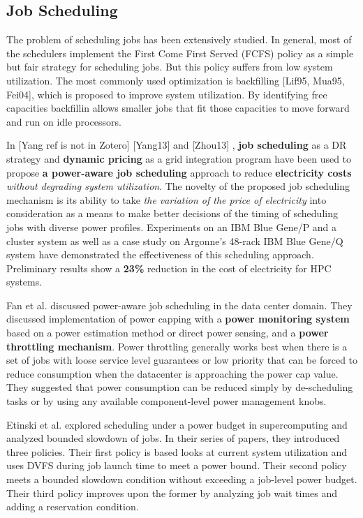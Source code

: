 \subsection{Job Scheduling}
The problem of scheduling jobs has been extensively studied. In general,
most of the schedulers implement the First Come First Served (FCFS) policy
as a simple but fair strategy for scheduling jobs. But this policy suffers
from low system utilization. The most commonly used optimization is backfilling
\cite{lifka_anl/ibm_1995} 
\cite{mualem_utilization_2001}
\cite{feitelson_parallel_2004}
[Lif95, Mua95, Fei04], which is proposed to improve system
utilization. By identifying free capacities backfillin allows smaller
jobs that fit those capacities to move forward and run on idle processors.

In [Yang ref is not in Zotero] 
\cite{zhou_reducing_2013}
[Yang13] and [Zhou13] , \textbf{job scheduling} as a DR strategy and
\textbf{dynamic pricing} as a grid integration program have been used to
propose \textbf{a power-aware job scheduling} approach to reduce
\textbf{electricity costs} \textit{without degrading system utilization}. 
The novelty of the proposed job scheduling
mechanism is its ability to take \textit{the variation of 
the price of electricity }into consideration as a means to make
better decisions of the timing of scheduling jobs with diverse power
profiles. Experiments on an IBM Blue Gene/P and a cluster system as
well as a case study on Argonne's 48-rack IBM Blue Gene/Q system have
demonstrated the effectiveness of this scheduling approach. Preliminary
results show a \textbf{23{\%}} reduction in the cost of electricity for HPC systems.

Fan et al. \cite{PowerAwareServer1} discussed power-aware job scheduling in the data center domain. 
They discussed implementation of power capping with a \textbf{power monitoring system} based on a power estimation
method or direct power sensing, and a \textbf{power throttling mechanism}. Power throttling generally works best when there is 
a set of jobs with loose service level guarantees or low priority that can be
forced to reduce consumption when the datacenter is approaching the power cap value. They suggested that power consumption 
can be reduced simply by de-scheduling tasks or by using any available component-level power management knobs.

Etinski et al. \cite{Etinski1,Etinski2,Etinski3,Etinski4} explored scheduling under a power budget in supercomputing and analyzed bounded slowdown of jobs. In their series of papers, they introduced three policies. Their first policy is based looks at current system utilization and uses DVFS during job launch time to meet a power bound. Their second policy meets a bounded slowdown condition without exceeding a job-level power budget. Their third policy improves upon the former by analyzing job wait times and adding a reservation condition. 


